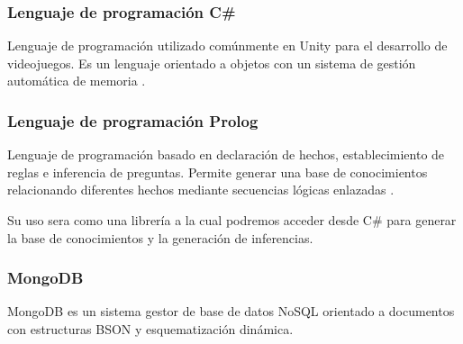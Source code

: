 \documentclass[12pt,twoside]{article}
\begin{document}
	\subsubsection{Lenguaje de programación C\#}
	Lenguaje de programación utilizado comúnmente en Unity para el desarrollo de videojuegos. Es un lenguaje orientado a objetos con un sistema de gestión automática de memoria  \cite{lan: c_sharp}.
	
	\subsubsection{Lenguaje de programación Prolog}
	Lenguaje de programación basado en declaración de hechos, establecimiento de reglas e inferencia de preguntas. Permite generar una base de conocimientos relacionando diferentes hechos  mediante secuencias lógicas enlazadas \cite{lan: prolog}.
	
	Su uso sera como una librería a la cual podremos acceder desde C\# para generar la base de conocimientos y la generación de inferencias. 
	
	\subsubsection{MongoDB}
	MongoDB es un sistema gestor de base de datos NoSQL orientado a documentos con estructuras BSON y esquematización dinámica.
\end{document}
